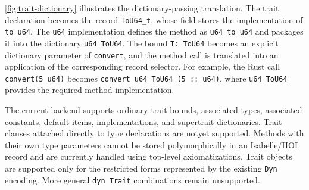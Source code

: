 \autoref{fig:trait-dictionary} illustrates the dictionary-passing translation.
The trait declaration becomes the record \texttt{ToU64\_t}, whose field stores the implementation of \texttt{to\_u64}. The \texttt{u64} implementation defines the method as \texttt{u64\_to\_u64} and packages it into the dictionary \texttt{u64\_ToU64}.
The bound \texttt{T: ToU64} becomes an explicit dictionary parameter of \texttt{convert}, and the method call is translated into an application of the corresponding record selector. For example, the Rust call \texttt{convert(5\_u64)} becomes \texttt{convert u64\_ToU64 (5 :: u64)}, where \texttt{u64\_ToU64} provides the required method implementation.

The current backend supports ordinary trait bounds, associated types,
associated constants, default items, implementations, and supertrait
dictionaries.  Trait clauses attached directly to type declarations are notyet supported.  Methods with their own type parameters cannot be stored
polymorphically in an Isabelle/HOL record and are currently handled using
top-level axiomatizations.
Trait objects are supported only for the restricted forms represented by the existing \texttt{Dyn} encoding.  More general \texttt{dyn Trait} combinations remain unsupported.





